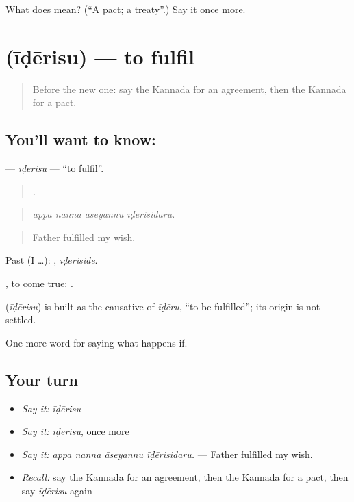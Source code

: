 \begin{tcolorbox}[breakable,colback=teal!4,colframe=teal!35!black,title={Before you move on}]
What does  mean? (\textquotedblleft{}A pact; a treaty\textquotedblright{}.) Say it once more.
\end{tcolorbox}
\section[\texorpdfstring{\kn{ಈಡೇರಿಸು} (īḍērisu)}{ಈಡೇರಿಸು (īḍērisu)}]{ (īḍērisu) — to fulfil}

\label{lesson:KA-C411-iderisu}



\begin{quote}
Before the new one: say the Kannada for an agreement, then the Kannada for a pact.
\end{quote}

\subsection*{You'll want to know: }
\textbf{} — \emph{īḍērisu} — \textquotedblleft{}to fulfil\textquotedblright{}.

\begin{quote}
   .
\end{quote}

\begin{quote}
\emph{appa nanna āseyannu īḍērisidaru.}
\end{quote}

\begin{quote}
Father fulfilled my wish.
\end{quote}

Past (I …): , \emph{īḍēriside}.

, to come true:  .

\begin{cousinweb}
\textbf{} (\emph{īḍērisu}) is built as the causative of \emph{īḍēru}, \textquotedblleft{}to be fulfilled\textquotedblright{}; its origin is not settled.
\end{cousinweb}

\begin{grammarlens}[title={What you've built}]
One more word for saying what happens if.
\end{grammarlens}

\subsection*{Your turn}
\begin{itemize}
\raggedright
  \item \emph{Say it:} \emph{īḍērisu}
  \item \emph{Say it:} \emph{īḍērisu}, once more
  \item \emph{Say it:} \emph{appa nanna āseyannu īḍērisidaru.} — Father fulfilled my wish.
  \item \emph{Recall:} say the Kannada for an agreement, then the Kannada for a pact, then say \emph{īḍērisu} again
\end{itemize}

